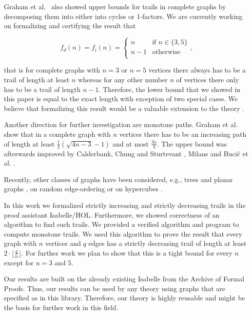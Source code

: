 \begin{isabellebody}
\begin{isamarkuptext}
Graham et al.~\cite{graham1973increasing} also showed upper bounds for trails in complete graphs by decomposing
them into either into cycles or 1-factors. We are currently working on formalizing and certifying the result 
that 

$$
f_d(n)= f_i(n) = 
\begin{cases}
n &  \text{if } n \in \{3,5\}\\
n-1 & \text{otherwise}\\
\end{cases},
$$

that is for complete graphs with $n=3$ or $n=5$ vertices there always has to be a trail of length at least $n$ whereas 
for any other number $n$ of vertices there only has to be a trail of length $n - 1$. Therefore, the lower bound that
we showed in this paper is equal to the exact length with exception of two special cases.  
We believe that formalizing this result would be a valuable extension to the theory .

Another direction for further investigation are monotone paths. 
Graham et al. \cite{graham1973increasing} show that in a complete graph with $n$ vertices there has to be an increasing path of length 
at least $\frac{1}{2}(\sqrt{4n-3}-1)$ and at most $\frac{3n}{4}$. 
The upper bound was afterwards improved by Calderbank, Chung and Sturtevant \cite{calderbank1984increasing}, 
Milans \cite{milans2015monotone} and Buci{\'c} et al. \cite{bucic2018nearly}. 

Recently, other classes of graphs have been considered, e.g., trees and planar graphs \cite{roditty2001monotone},
on random edge-ordering \cite{yuster2001large} or on hypercubes \cite{de2015increasing}.%
\end{isamarkuptext}\isamarkuptrue%
%
\isadelimdocument
%
\endisadelimdocument
%
\isatagdocument
%
\isamarkuptrue%
%
\endisatagdocument
{\isafolddocument}%
%
\isadelimdocument
%
\endisadelimdocument
%
\begin{isamarkuptext}%
In this work we formalized strictly increasing and strictly decreasing trails in the proof assistant Isabelle/HOL. 
Furthermore, we showed correctness of an algorithm to find such trails. We provided a verified algorithm and program to compute monotone trails. 
We used this algorithm to
prove the result that every graph with $n$ vertices and $q$ edges has a strictly decreasing trail of length at least
$2\cdot\lfloor\frac{q}{n}\rfloor$. For further work we plan to show that this is a tight bound for every $n$ except for $n = 3$ and $5$. 

Our results are built on the already existing Isabelle  from the Archive of Formal Proofs. 
Thus, our results can be used by any theory using graphs that are specified as in this library.
Therefore, our theory is highly reusable and might be the basis for further work in this field.%
\end{isamarkuptext}\isamarkuptrue%
%
\isadelimtheory
%
\endisadelimtheory
%
\isatagtheory
%
\endisatagtheory
{\isafoldtheory}%
%
\isadelimtheory
%
\endisadelimtheory
%
\end{isabellebody}%
